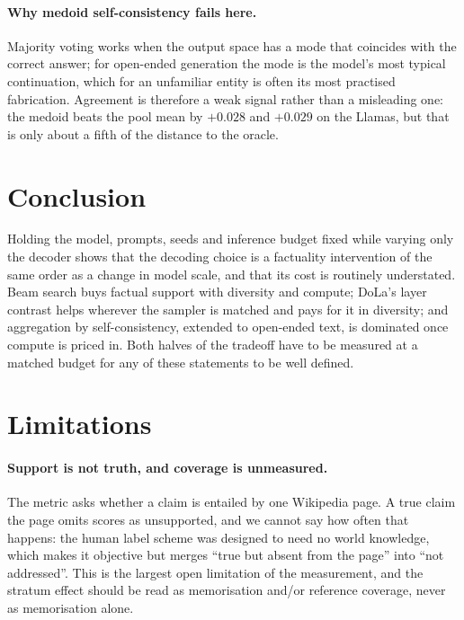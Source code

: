 \documentclass[11pt]{article}
\begin{document}
\paragraph{Why medoid self-consistency fails here.}
Majority voting works when the output space has a mode that coincides with the
correct answer; for open-ended generation the mode is the model's most typical
continuation, which for an unfamiliar entity is often its most practised
fabrication. Agreement is therefore a weak signal rather than a misleading
one: the medoid beats the pool mean by $+0.028$ and $+0.029$ on the Llamas,
but that is only about a fifth of the distance to the oracle.

\section{Conclusion}

Holding the model, prompts, seeds and inference budget fixed while varying only
the decoder shows that the decoding choice is a factuality intervention of the
same order as a change in model scale, and that its cost is routinely
understated. Beam search buys factual support with diversity and compute;
DoLa's layer contrast helps wherever the sampler is matched and pays for it in
diversity; and aggregation by
self-consistency, extended to open-ended text, is dominated once compute is
priced in. Both halves of the tradeoff have to be measured at a matched budget
for any of these statements to be well defined.

\section*{Limitations}

\paragraph{Support is not truth, and coverage is unmeasured.} The metric asks
whether a claim is entailed by one Wikipedia page. A true claim the page omits
scores as unsupported, and we cannot say how often that happens: the human
label scheme was designed to need no world knowledge, which makes it objective
but merges ``true but absent from the page'' into ``not addressed''. This is
the largest open limitation of the measurement, and the stratum effect should
be read as memorisation and/or reference coverage, never as memorisation alone.
\end{document}
